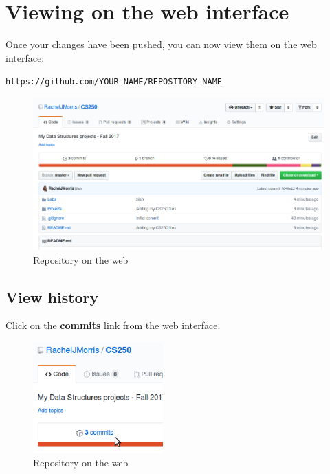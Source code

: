 \documentclass[a4paper,12pt,oneside]{book}
\begin{document}
    \newpage

    \section{Viewing on the web interface}

        Once your changes have been pushed, you can now view them on the
        web interface:

        \begin{center}
        \texttt{https://github.com/YOUR-NAME/REPOSITORY-NAME}
        \end{center}
        
        \begin{figure}[h]
            \centering
            \includegraphics[width=14cm]{images/github-webrepo.png}
            \caption{Repository on the web}
        \end{figure}

        \subsection{View history}

        Click on the \textbf{commits} link from the web interface.

        \begin{figure}[h]
            \centering
            \includegraphics[width=5cm]{images/github-commits.png}
            \caption{Repository on the web}
        \end{figure}
        
\end{document}
